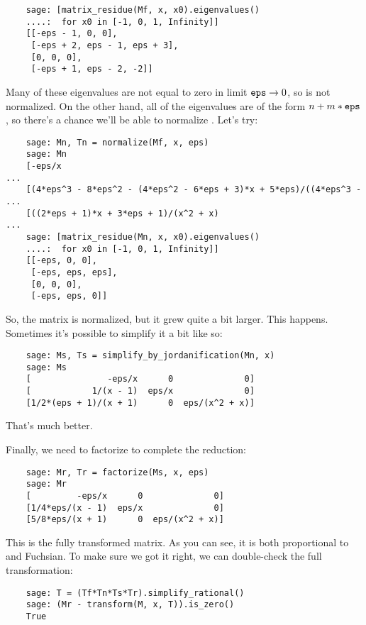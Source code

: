 \documentclass[12pt,a4paper]{article}
\begin{document}
\begin{verbatim}
    sage: [matrix_residue(Mf, x, x0).eigenvalues()
    ....:  for x0 in [-1, 0, 1, Infinity]]
    [[-eps - 1, 0, 0],
     [-eps + 2, eps - 1, eps + 3],
     [0, 0, 0],
     [-eps + 1, eps - 2, -2]]
\end{verbatim}

Many of these eigenvalues are not equal to zero in limit $\texttt{eps}\to0$, so  is not normalized.
On the other hand, all of the eigenvalues are of the form $n + m*\texttt{eps}$, so there's a chance we'll be able to normalize .
Let's try:

\begin{verbatim}
    sage: Mn, Tn = normalize(Mf, x, eps)
    sage: Mn
    [-eps/x                                                            ...
    [(4*eps^3 - 8*eps^2 - (4*eps^2 - 6*eps + 3)*x + 5*eps)/((4*eps^3 - ...
    [((2*eps + 1)*x + 3*eps + 1)/(x^2 + x)                             ...
    sage: [matrix_residue(Mn, x, x0).eigenvalues()
    ....:  for x0 in [-1, 0, 1, Infinity]]
    [[-eps, 0, 0],
     [-eps, eps, eps],
     [0, 0, 0],
     [-eps, eps, 0]]
\end{verbatim}

So, the matrix is normalized, but it grew quite a bit larger.
This happens.
Sometimes it's possible to simplify it a bit like so:

\begin{verbatim}
    sage: Ms, Ts = simplify_by_jordanification(Mn, x)
    sage: Ms
    [               -eps/x      0              0]
    [            1/(x - 1)  eps/x              0]
    [1/2*(eps + 1)/(x + 1)      0  eps/(x^2 + x)]
\end{verbatim}

That's much better.

Finally, we need to factorize  to complete the reduction:

\begin{verbatim}
    sage: Mr, Tr = factorize(Ms, x, eps)
    sage: Mr
    [         -eps/x      0              0]
    [1/4*eps/(x - 1)  eps/x              0]
    [5/8*eps/(x + 1)      0  eps/(x^2 + x)]
\end{verbatim}

This is the fully transformed matrix.
As you can see, it is both proportional to  and Fuchsian.
To make sure we got it right, we can double-check the full transformation:

\begin{verbatim}
    sage: T = (Tf*Tn*Ts*Tr).simplify_rational()
    sage: (Mr - transform(M, x, T)).is_zero()
    True
\end{verbatim}
\end{document}
